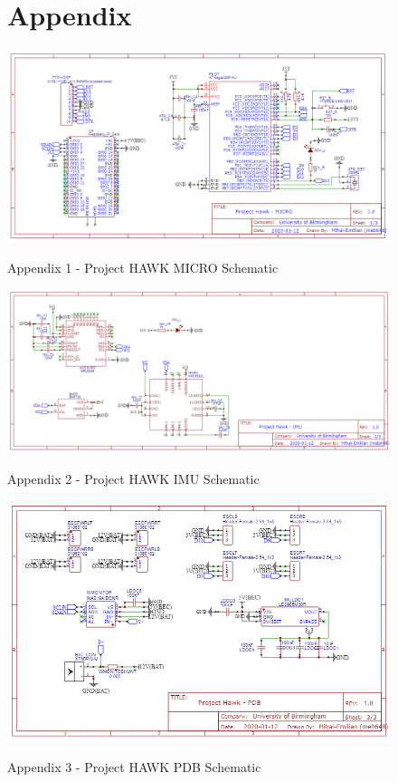 \documentclass{IEEEtran}
\begin{document}
\begin{figure}
\section*{Appendix}
\begin{center}\includegraphics[scale=.5]{MICRO.png}\end{center}
\begin{it}\begin{center}Appendix 1 - Project HAWK MICRO Schematic \end{center}\end{it}

\begin{center}\includegraphics[scale=.428]{IMU.png}\end{center}
\begin{it}\begin{center}Appendix 2  - Project HAWK IMU Schematic \end{center}\end{it}
\end{figure}
\clearpage
\begin{figure}
\begin{center}\includegraphics[scale=.65]{PDB.png}\end{center}
\begin{it}\begin{center}Appendix 3 - Project HAWK PDB Schematic \end{center}\end{it}
\end{figure}
\clearpage
\end{document}
